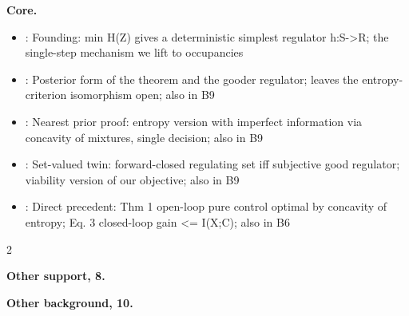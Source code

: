 \documentclass[10pt]{article}
\newcommand{\memb}[1]{\par\smallskip\textbf{#1}\quad}
\begin{document}
\memb{Core.}
\begin{itemize}[nosep,leftmargin=1.2em]
\item \citet{Conant-good70}: Founding: min H(Z) gives a deterministic simplest regulator h:S-\textgreater{}R; the single-step mechanism we lift to occupancies
\item \citet{Wentworth-fixing21}: Posterior form of the theorem and the gooder regulator; leaves the entropy-criterion isomorphism open; also in B9
\item \citet{Harwood-generalization25}: Nearest prior proof: entropy version with imperfect information via concavity of mixtures, single decision; also in B9
\item \citet{Virgo-good25}: Set-valued twin: forward-closed regulating set iff subjective good regulator; viability version of our objective; also in B9
\item \citet{Touchette-information00}: Direct precedent: Thm 1 open-loop pure control optimal by concavity of entropy; Eq. 3 closed-loop gain \textless{}= I(X;C); also in B6
\end{itemize}
\begin{multicols}{2}
\memb{Other support, 8.} \citetext{\citealp{Baez-internal16}; \citealp{Armstrong-connecting21}; \citealp{Moss-thoughts22}; \citealp{Harwood-straightforward24}; \citealp{Ruffini-algorithmic25}; \citealp{Weidemann-entropy69}\dag; \citealp{Lloyd-information96}\dag; \citealp{Touchette-information04}}

\memb{Other background, 10.} {\footnotesize \citetext{\citealp{Darbesio-corollary21}; \citealp{testingthewaters-model25}; \citealp{Nakajima-biologically15}; \citealp{Ashby-ethical20}; \citealp{Ashby-problems22}; \citealp{Froese-autopoiesis23}; \citealp{Ruffini-algorithmic24}; \citealp{Ruffini-structured25}; \citealp{Sarosiek-regulatory25}; \citealp{Zhuravlev-verifying26}}}

\end{multicols}
\end{document}
